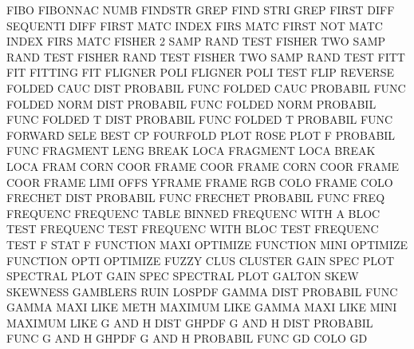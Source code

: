 FIBO                                    FIBONNAC NUMB
FINDSTR                                 GREP
FIND     STRI                           GREP
FIRST    DIFF                           SEQUENTI DIFF
FIRST    MATC                           INDEX    FIRS MATC
FIRST    NOT  MATC                      INDEX    FIRS MATC
FISHER   2    SAMP RAND TEST            FISHER   TWO  SAMP RAND TEST
FISHER   RAND TEST                      FISHER   TWO  SAMP RAND TEST
FITT                                    FIT
FITTING                                 FIT
FLIGNER  POLI                           FLIGNER  POLI TEST
FLIP                                    REVERSE
FOLDED   CAUC DIST                      PROBABIL FUNC
FOLDED   CAUC                           PROBABIL FUNC
FOLDED   NORM DIST                      PROBABIL FUNC
FOLDED   NORM                           PROBABIL FUNC
FOLDED   T    DIST                      PROBABIL FUNC
FOLDED   T                              PROBABIL FUNC
FORWARD  SELE                           BEST     CP
FOURFOLD PLOT                           ROSE     PLOT
F                                       PROBABIL FUNC
FRAGMENT LENG                           BREAK    LOCA
FRAGMENT LOCA                           BREAK    LOCA
FRAM     CORN COOR                      FRAME    COOR
FRAME    CORN COOR                      FRAME    COOR
FRAME    LIMI OFFS                      YFRAME
FRAME    RGB  COLO                      FRAME    COLO
FRECHET  DIST                           PROBABIL FUNC
FRECHET                                 PROBABIL FUNC
FREQ                                    FREQUENC
FREQUENC TABLE                          BINNED
FREQUENC WITH A    BLOC TEST            FREQUENC TEST
FREQUENC WITH BLOC TEST                 FREQUENC TEST
F        STAT                           F
FUNCTION MAXI                           OPTIMIZE
FUNCTION MINI                           OPTIMIZE
FUNCTION OPTI                           OPTIMIZE
FUZZY    CLUS                           CLUSTER
GAIN     SPEC PLOT                      SPECTRAL PLOT
GAIN     SPEC                           SPECTRAL PLOT
GALTON   SKEW                           SKEWNESS
GAMBLERS RUIN                           LOSPDF
GAMMA    DIST                           PROBABIL FUNC
GAMMA    MAXI LIKE METH                 MAXIMUM  LIKE
GAMMA    MAXI LIKE MINI                 MAXIMUM  LIKE
G        AND  H    DIST                 GHPDF
G        AND  H    DIST                 PROBABIL FUNC
G        AND  H                         GHPDF
G        AND  H                         PROBABIL FUNC
GD       COLO                           GD

